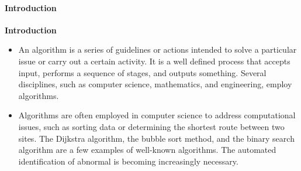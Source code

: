 %
%
%
%




{ 
 
 	\framesubtitle{Introduction}	
 	\textbf{Introduction} 
 	\begin{itemize} 
 		\item An algorithm is a series of guidelines or actions intended to solve a particular issue or carry out a certain activity. It is a well defined process that accepts input, performs a sequence of stages, and outputs something. Several disciplines, such as computer science, mathematics, and engineering, employ algorithms.
 		\item Algorithms are often employed in computer science to address computational issues, such as sorting data or determining the shortest route between two sites. The Dijkstra algorithm, the bubble sort method, and the binary search algorithm are a few examples of well-known algorithms. The automated identification of abnormal is becoming increasingly necessary.
 	\end{itemize}

}

